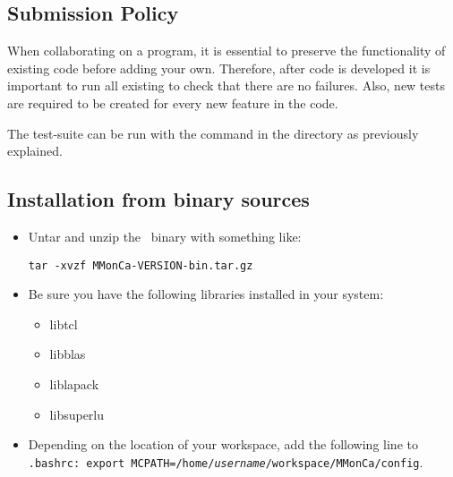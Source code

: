 \subsection{Submission Policy}
When collaborating on a program, it is essential to preserve the functionality of existing code before adding your own. Therefore, after code is developed it is important to run all existing  to check that there are no failures. Also, new tests are required to be created for every new feature in the code.

The test-suite can be run with the command  in the  directory as previously explained.

\subsection{Installation from binary sources}
\begin{itemize}
\item Untar and unzip the \MMonCa\ binary with something like:
\begin{verbatim}
tar -xvzf MMonCa-VERSION-bin.tar.gz
\end{verbatim}
\item Be sure you have the following libraries installed in your system:
\begin{itemize}
\item libtcl
\item libblas
\item liblapack
\item libsuperlu
\end{itemize}
 \item Depending on the location of your workspace, add the following line to {\tt .bashrc: export MCPATH=/home/\textit{username}/workspace/MMonCa/config}.
\end{itemize}
